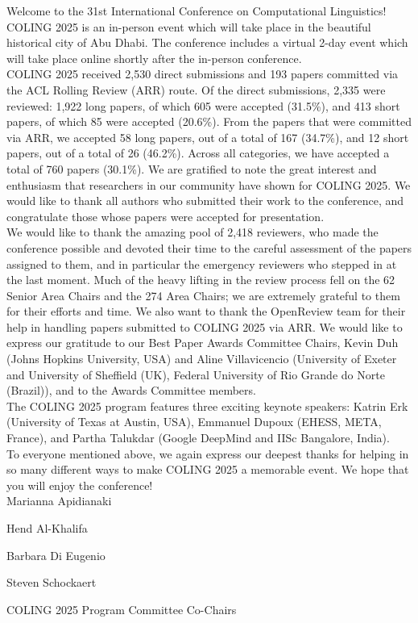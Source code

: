 Welcome to the 31st International Conference on Computational Linguistics! \\

COLING 2025 is an in-person event which will take place in the beautiful historical city of Abu Dhabi. The conference includes a virtual 2-day event which will take place online shortly after the in-person conference. \\

COLING 2025 received 2,530 direct submissions and 193 papers committed via the ACL Rolling Review (ARR) route. Of the direct submissions, 2,335 were reviewed: 1,922 long papers, of which 605 were accepted (31.5\%), and 413 short papers, of which 85 were accepted (20.6\%). From the papers that were committed via ARR, we accepted 58 long papers, out of a total of 167 (34.7\%), and 12 short papers, out of a total of 26 (46.2\%). Across all categories, we have accepted a total of 760 papers (30.1\%). We are gratified to note the great interest and enthusiasm that researchers in our community have shown for COLING 2025. We would like to thank all authors who submitted their work to the conference, and congratulate those whose papers were accepted for presentation. \\

We would like to thank the amazing pool of 2,418 reviewers, who made the conference possible and devoted their time to the careful assessment of the papers assigned to them, and in particular the emergency reviewers who stepped in at the last moment. Much of the heavy lifting in the review process fell on the 62 Senior Area Chairs and the 274 Area Chairs; we are extremely grateful to them for their efforts and time. We also want to thank the OpenReview team for their help in handling papers submitted to COLING 2025 via ARR. We would like to express our gratitude to our Best Paper Awards Committee Chairs, Kevin Duh (Johns Hopkins University, USA) and Aline Villavicencio (University of Exeter and University of Sheffield (UK), Federal University of Rio Grande do Norte (Brazil)), and to the Awards Committee members. \\

The COLING 2025 program features three exciting keynote speakers: Katrin Erk (University of Texas at Austin, USA), Emmanuel Dupoux (EHESS, META, France), and Partha Talukdar (Google DeepMind and IISc Bangalore, India).\\

To everyone mentioned above, we again express our deepest thanks for helping in so many different ways to make COLING 2025 a memorable event. We hope that you will enjoy the conference!\\

Marianna Apidianaki

Hend Al-Khalifa

Barbara Di Eugenio

Steven Schockaert

COLING 2025 Program Committee Co-Chairs

